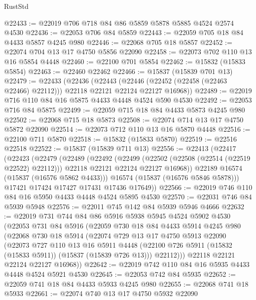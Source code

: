 \begin{lexlean}{RustStd}
\begin{coremodule}
{\begin{coremodule}
{{{{{{{{{{{{{{{{{{{{{{{{{{{{{{{{{{{{{{{{{{{{{{{{{{{{{{{{{{{{@22433 := @22019 @706 @718 @84 @86 @5859 @5878 @5885 @4524 @2574 @4530
@22436 := @22053 @706 @84 @5859
@22443 := @22059 @705 @18 @84 @4433 @5857 @4245 @980
@22446 := @22068 @705 @18 @5857
@22452 := @22074 @704 @13 @17 @4750 @5856 @22090
@22458 := @22073 @702 @110 @13 @16 @5854 @4448
@22460 := @22100 @701 @5854
@22462 := @15832 (@15833 @5854)
@22463 := @22460 @22462
@22466 := @15837 (@15839 @701 @13)
@22479 := @22433
    (@22436
      (@22443 (@22446 (@22452 (@22458 (@22463 @22466) @22112))) @22118 @22121 @22124 @22127 @16968))
@22489 := @22019 @716 @110 @84 @16 @5875 @4433 @4448 @4524 @590 @4530
@22492 := @22053 @716 @84 @5875
@22499 := @22059 @715 @18 @84 @4433 @5873 @4245 @980
@22502 := @22068 @715 @18 @5873
@22508 := @22074 @714 @13 @17 @4750 @5872 @22090
@22514 := @22073 @712 @110 @13 @16 @5870 @4448
@22516 := @22100 @711 @5870
@22518 := @15832 (@15833 @5870)
@22519 := @22516 @22518
@22522 := @15837 (@15839 @711 @13)
@22556 := @22413
    (@22417
      (@22423
        (@22479
          (@22489
            (@22492
              (@22499
                (@22502 (@22508 (@22514 (@22519 @22522) @22112)))
                @22118
                @22121
                @22124
                @22127
                @16968))
            @22189
            @16574
            (@15837 (@16576 @5862 @4433)))
          @16574
          (@15837 (@16576 @5846 @5878)))
        @17421
        @17424
        @17427
        @17431
        @17436
        @17649))
@22566 := @22019 @746 @110 @84 @16 @5950 @4433 @4448 @4524 @5895 @4530
@22570 := @22031 @746 @84 @5939 @5948
@22576 := @22011 @745 @142 @84 @5939 @5946 @4666
@22632 := @22019
    @731
    @744
    @84
    @86
    @5916
    @5938
    @5945
    @4524
    @5902
    @4530
    (@22053
      @731
      @84
      @5916
      (@22059
        @730
        @18
        @84
        @4433
        @5914
        @4245
        @980
        (@22068
          @730
          @18
          @5914
          (@22074
            @729
            @13
            @17
            @4750
            @5913
            @22090
            (@22073
              @727
              @110
              @13
              @16
              @5911
              @4448
              (@22100 @726 @5911 (@15832 (@15833 @5911)) (@15837 (@15839 @726 @13)))
              @22112)))
        @22118
        @22121
        @22124
        @22127
        @16968))
@22642 := @22019 @742 @110 @84 @16 @5935 @4433 @4448 @4524 @5921 @4530
@22645 := @22053 @742 @84 @5935
@22652 := @22059 @741 @18 @84 @4433 @5933 @4245 @980
@22655 := @22068 @741 @18 @5933
@22661 := @22074 @740 @13 @17 @4750 @5932 @22090
}}}}}}}}}}}}}}}}}}}}}}}}}}}}}}}}}}}}}}}}}}}}}}}}}}}}}}}}}}}}
\end{coremodule}}
\end{coremodule}
\end{lexlean}
